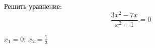 \begin{ex}
	Решить уравнение:
	$$ \dfrac{3x^2-7x}{x^2+1}=0 $$
	\begin{answer}
		$x_1=0$; $x_2=\frac{7}{3}$
	\end{answer}
\end{ex}